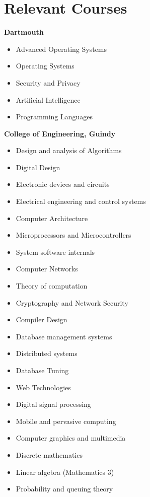 \documentclass[11pt,a4paper,sans]{moderncv} %
\begin{document}

\section{Relevant Courses}

\textbf{Dartmouth}
\begin{itemize}
\item Advanced Operating Systems
\item Operating Systems
\item Security and Privacy
\item Artificial Intelligence
\item Programming Languages
\end{itemize}

\textbf{College of Engineering, Guindy}

\begin{itemize}
\item Design and analysis of Algorithms
\item Digital Design
\item Electronic devices and circuits
\item Electrical engineering and control systems
\item Computer Architecture
\item Microprocessors and Microcontrollers
\item System software internals
\item Computer Networks
\item Theory of computation
\item Cryptography and Network Security
\item Compiler Design
\item Database management systems
\item Distributed systems
\item Database Tuning
\item Web Technologies
\item Digital signal processing
\item Mobile and pervasive computing
\item Computer graphics and multimedia
\item Discrete mathematics
\item Linear algebra (Mathematics 3)
\item Probability and queuing theory

\end{itemize}
        
\end{document}
